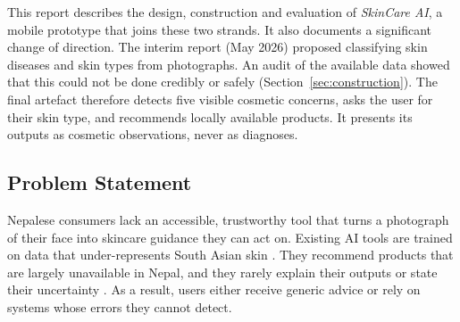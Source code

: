 This report describes the design, construction and evaluation of \emph{SkinCare AI}, a mobile prototype that joins these two strands. It also documents a significant change of direction. The interim report (May 2026) proposed classifying skin diseases and skin types from photographs. An audit of the available data showed that this could not be done credibly or safely (Section~\ref{sec:construction}). The final artefact therefore detects five visible cosmetic concerns, asks the user for their skin type, and recommends locally available products. It presents its outputs as cosmetic observations, never as diagnoses.

\subsection{Problem Statement}
\label{sec:problem}

Nepalese consumers lack an accessible, trustworthy tool that turns a photograph of their face into skincare guidance they can act on. Existing AI tools are trained on data that under-represents South Asian skin \citep{groh2021,daneshjou2022}. They recommend products that are largely unavailable in Nepal, and they rarely explain their outputs or state their uncertainty \citep{ramrakhiani2024}. As a result, users either receive generic advice or rely on systems whose errors they cannot detect.
